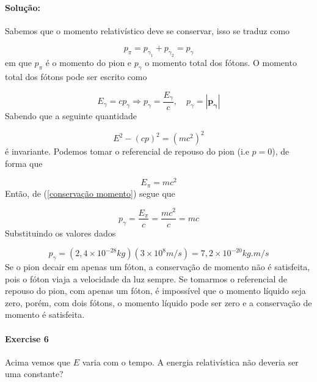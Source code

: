 \documentclass[10pt,a4paper]{article}
\begin{document}
\paragraph{Solução:} Sabemos que o momento relativístico deve se conservar, isso se traduz como

\begin{equation}\label{conservação momento}
 p_{\pi} = p_{\gamma_1} + p_{\gamma_2} = p_{\gamma}
\end{equation}
em que $p_{\pi}$ é o momento do pion e $p_{\gamma}$ o momento total dos fótons. O momento total dos fótons pode ser escrito como 

\begin{equation}\label{momento foton}
E_{\gamma} = cp_{\gamma} \Rightarrow p_{\gamma} = \frac{E_{\gamma}}{c}, \quad p_{\gamma} = |\mathbf{p_{\gamma}}|
\end{equation}
Sabendo que a seguinte quantidade 

\begin{equation}\label{energia momento}
E^2 - (cp)^2 = (mc^2)^2
\end{equation}
é invariante. Podemos tomar o referencial de repouso do pion (i.e $p =0$), de forma que 

\begin{equation}\label{energia repouso}
E_{\pi} = mc^2
\end{equation}
Então, de (\ref{conservação momento}) segue que

\begin{equation}
p_{\gamma} = \frac{E_{\pi}}{c} = \frac{mc^2}{c} = mc
\end{equation}
Substituindo os valores dados 

\begin{equation}
p_{\gamma} = (2,4\times 10^{-28}\si{kg})(3\times 10^8 \unit{m/s}) = 7,2 \times 10^{-20}\si{kg.m/s}
\end{equation}
Se o pion decair em apenas um fóton, a conservação de momento não é satisfeita, pois o fóton viaja a velocidade da luz sempre. Se tomarmos o referencial de repouso do pion, com apenas um fóton, é impossível que o momento líquido seja zero, porém, com dois fótons, o momento líquido pode ser zero e a conservação de momento é satisfeita.

\paragraph{Exercise 6} Acima vemos que $E$ varia com o tempo. A energia relativística não deveria ser uma constante?
\end{document}

